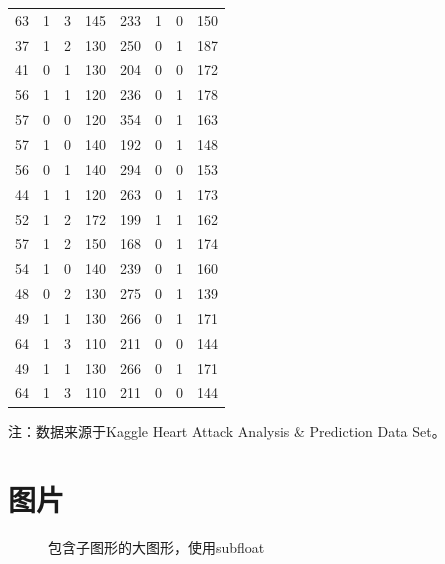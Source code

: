 {\begin{longtable}[c]{c*{7}{r}}
    63 & 1 & 3 & 145 & 233 & 1 & 0 & 150 \\
    37 & 1 & 2 & 130 & 250 & 0 & 1 & 187 \\
    41 & 0 & 1 & 130 & 204 & 0 & 0 & 172 \\
    56 & 1 & 1 & 120 & 236 & 0 & 1 & 178 \\
    57 & 0 & 0 & 120 & 354 & 0 & 1 & 163 \\
    57 & 1 & 0 & 140 & 192 & 0 & 1 & 148 \\
    56 & 0 & 1 & 140 & 294 & 0 & 0 & 153 \\
    44 & 1 & 1 & 120 & 263 & 0 & 1 & 173 \\
    52 & 1 & 2 & 172 & 199 & 1 & 1 & 162 \\
    57 & 1 & 2 & 150 & 168 & 0 & 1 & 174 \\
    54 & 1 & 0 & 140 & 239 & 0 & 1 & 160 \\
    48 & 0 & 2 & 130 & 275 & 0 & 1 & 139 \\
    49 & 1 & 1 & 130 & 266 & 0 & 1 & 171 \\
    64 & 1 & 3 & 110 & 211 & 0 & 0 & 144 \\
    49 & 1 & 1 & 130 & 266 & 0 & 1 & 171 \\
    64 & 1 & 3 & 110 & 211 & 0 & 0 & 144 \\
    \bottomrule[1.5pt]
\end{longtable}
\footnotesize 注：数据来源于Kaggle Heart Attack Analysis \& Prediction Data Set。}

\section{图片}
\label{sec:figure}

\begin{figure}[htb]\centering
    \hfil
    \caption{包含子图形的大图形，使用subfloat}
    \label{fig:example-fig-subfloat}
\end{figure}

